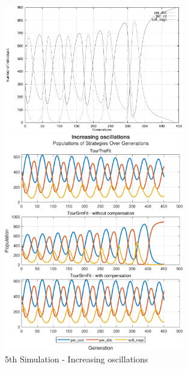 \documentclass[12pt]{article}
\begin{document}
	\begin{figure}[h]
	    \centering
		\includegraphics[width=0.7\textwidth]{RefPaperFigures/fig5.jpeg}\par\vspace{0.5em}
	    \includegraphics[width=0.7\textwidth]{Increasing oscillations.pdf}
	    \caption{5th Simulation - Increasing oscillations}
	    \label{fig:Increasing oscillations}
	\end{figure}
\end{document}
